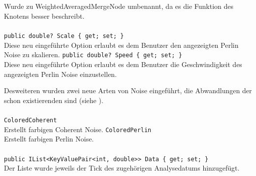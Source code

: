 \subsection{}

\paragraph{}
\begin{itemize}
	\change Wurde zu WeightedAveragedMergeNode umbenannt, da es die Funktion des Knotens besser beschreibt.
\end{itemize}

\paragraph{}
\begin{itemize}
	\add \verb!public double? Scale { get; set; }! \\
	Diese neu eingeführte Option erlaubt es dem Benutzer den angezeigten Perlin Noise zu skalieren.
	\add \verb!public double? Speed { get; set; }! \\
	Diese neu eingeführte Option erlaubt es dem Benutzer die Geschwindigkeit des angezeigten Perlin Noise einzustellen.
\end{itemize}

Desweiteren wurden zwei neue Arten von Noise eingeführt, die Abwandlungen der schon existierenden sind (siehe ).

\paragraph{}
\begin{itemize}
	\add \verb!ColoredCoherent! \\
	Erstellt farbigen Coherent Noise.
	\add \verb!ColoredPerlin! \\
	Erstellt farbigen Perlin Noise.
\end{itemize}

\paragraph{}
\begin{itemize}
	\change \verb!public IList<KeyValuePair<int, double>> Data { get; set; }! \\
	Der Liste wurde jeweils der Tick des zugehörigen Analysedatums hinzugefügt.
\end{itemize}

